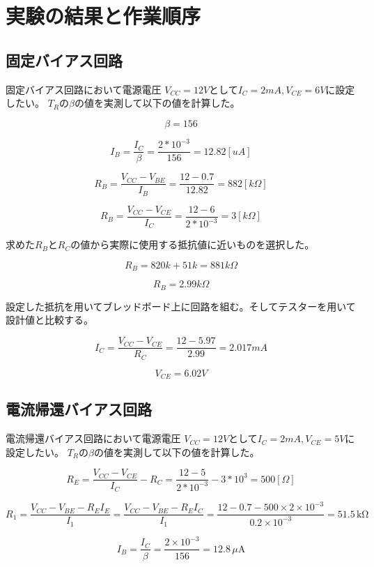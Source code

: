 \documentclass[a4paper,11pt,xelatex,ja=standard]{bxjsarticle}
\begin{document}
\section{実験の結果と作業順序}
    \subsection{固定バイアス回路}
        固定バイアス回路において電源電圧 $V_{CC} = 12V$として$I_C = 2mA , V_{CE} = 6V$に設定したい。
        $T_R$の$\beta$の値を実測して以下の値を計算した。

        $$
        \beta = 156
        $$

        $$
        I_B = \frac{I_C}{\beta} = \frac{2 * 10^{-3}}{156} = 12.82 [uA]
        $$

        $$
        R_B = \frac{V_{CC} - V_{BE}}{I_B} = \frac{12 - 0.7}{12.82} = 882 [k \Omega]
        $$

        $$
        R_B = \frac{V_{CC} - V_{CE}}{I_C} = \frac{12 - 6}{2 * 10^{-3}} = 3 [k \Omega]
        $$

        求めた$R_B$と$R_C$の値から実際に使用する抵抗値に近いものを選択した。

        $$
        R_B = 820k + 51k = 881k \Omega
        $$

        $$
        R_B = 2.99k \Omega
        $$

        設定した抵抗を用いてブレッドボード上に回路を組む。そしてテスターを用いて設計値と比較する。

        $$
        I_C = \frac{V_{CC}-V_{CE}}{R_C} = \frac{12-5.97}{2.99} = 2.017 mA 
        $$

        $$
        V_{CE} = 6.02 V
        $$

    \subsection{電流帰還バイアス回路}
        電流帰還バイアス回路において電源電圧 $V_{CC} = 12V$として$I_C = 2mA , V_{CE} = 5V$に設定したい。
        $T_R$の$\beta$の値を実測して以下の値を計算した。

        $$
        R_E=\frac{V_{CC}-V_{CE}}{I_C} - R_C=\frac{12-5}{2*10^{-3}}-3*10^3= 500[\Omega]
        $$


        $$
         R_1 = \frac{V_{CC} - V_{BE} - R_E I_E}{I_1} = \frac{V_{CC} - V_{BE} - R_E I_C}{I_1} = \frac{12 - 0.7 - 500 \times 2 \times 10^{-3}}{0.2 \times 10^{-3}} = 51.5 \, \text{kΩ}
        $$

        \[ I_B = \frac{I_C}{\beta} = \frac{2 \times 10^{-3}}{156} = 12.8 \, \mu\text{A} \]
\end{document}
